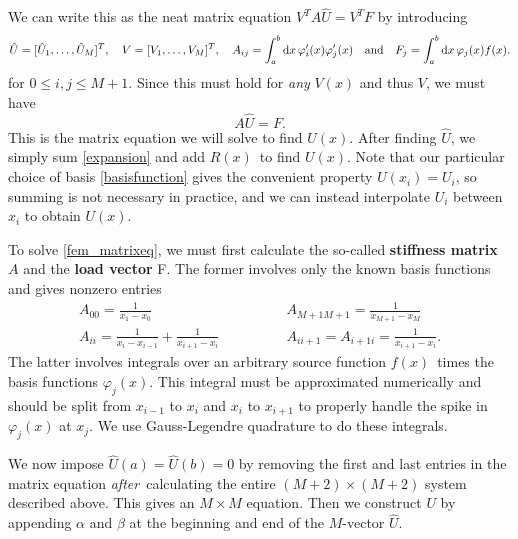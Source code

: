 We can write this as the neat matrix equation $V^T A \hat{U} = V^T F$ by introducing
\begin{equation*}
	\hat{U} = [\hat{U}_1, \dots, \hat{U}_M]^T,
	\quad
	V = [V_1, \dots, V_M]^T,
	\quad
	A_{ij} = \integral{\varphi'_i(x) \varphi'_j(x)}{x}{a}{b}
	\quad \text{and} \quad
	F_j = \integral{\varphi_j(x) f(x)}{x}{a}{b}.
\end{equation*}
for $0 \leq i, j \leq M+1$.
Since this must hold for \emph{any} $V(x)$ and thus $V$, we must have
\begin{equation}
	A \hat{U} = F.
	\label{fem_matrixeq}
\end{equation}
This is the matrix equation we will solve to find $U(x)$.
After finding $\hat{U}$, we simply sum \ref{expansion} and add $R(x)$ to find $U(x)$.
Note that our particular choice of basis \ref{basisfunction} gives the convenient property $U(x_i) = U_i$, so summing is not necessary in practice, and we can instead interpolate $U_i$ between $x_i$ to obtain $U(x)$.

To solve \ref{fem_matrixeq}, we must first calculate the so-called \textbf{stiffness matrix} $A$ and the \textbf{load vector} F.
The former involves only the known basis functions and gives nonzero entries
\begin{align*}
	A_{00} = \frac{1}{x_1 - x_0}                           \qquad & \qquad A_{M+1 M+1} = \frac{1}{x_{M+1}-x_M} \\
	A_{ii} = \frac{1}{x_i-x_{i-1}} + \frac{1}{x_{i+1}-x_i} \qquad & \qquad A_{i i+1} = A_{i+1 i} = \frac{1}{x_{i+1}-x_i}.
\end{align*}
The latter involves integrals over an arbitrary source function $f(x)$ times the basis functions $\varphi_j(x)$.
This integral must be approximated numerically and should be split from $x_{i-1}$ to $x_i$ and $x_i$ to $x_{i+1}$ to properly handle the spike in $\varphi_j(x)$ at $x_j$.
We use Gauss-Legendre quadrature to do these integrals. \cite{scipy_fixed_quad}

We now impose $\hat{U}(a) = \hat{U}(b) = 0$ by removing the first and last entries in the matrix equation \emph{after} calculating the entire $(M+2) \times (M+2)$ system described above.
This gives an $M \times M$ equation.
Then we construct $U$ by appending $\alpha$ and $\beta$ at the beginning and end of the $M$-vector $\hat{U}$.

